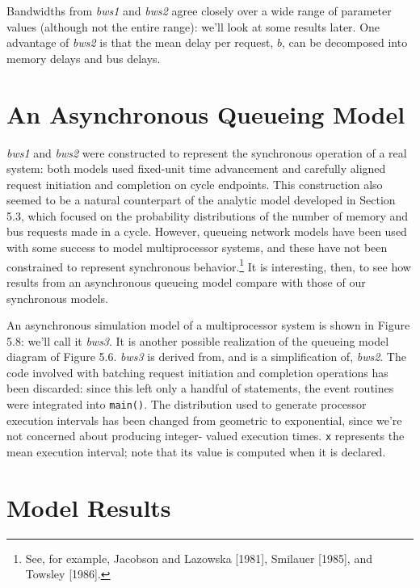 Bandwidths from \emph{bws1} and \emph{bws2} agree closely over a wide range of
parameter values (although not the entire range): we'll look at some results
later. One advantage of \emph{bws2} is that the mean delay per request, $b$, can be
decomposed into memory delays and bus delays.

\section{An Asynchronous Queueing Model}

\emph{bws1} and \emph{bws2} were constructed to represent the synchronous operation of
a real system: both models used fixed-unit time advancement and carefully
aligned request initiation and completion on cycle endpoints. This construction
also seemed to be a natural counterpart of the analytic model developed
in Section 5.3, which focused on the probability distributions of the number of
memory and bus requests made in a cycle. However, queueing network models
have been used with some success to model multiprocessor systems, and these
have not been constrained to represent synchronous behavior.\footnote{See, for example, Jacobson and Lazowska [1981], Smilauer [1985], and Towsley [1986].} It is
interesting, then, to see how results from an asynchronous queueing model
compare with those of our synchronous models.

An asynchronous simulation model of a multiprocessor system is shown in
Figure 5.8: we'll call it \emph{bws3}. It is another possible realization of the
queueing model diagram of Figure 5.6. \emph{bws3} is derived from, and is a simplification
of, \emph{bws2}. The code involved with batching request initiation and
completion operations has been discarded: since this left only a handful of
statements, the event routines were integrated into \texttt{main()}. The distribution
used to generate processor execution intervals has been changed from
geometric to exponential, since we're not concerned about producing integer-
valued execution times. \texttt{x} represents the mean execution interval; note that
its value is computed when it is declared.







\section{Model Results}

